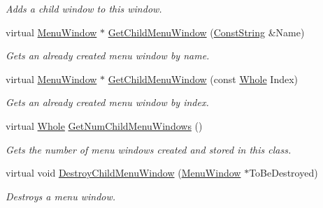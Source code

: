 \begin{DoxyCompactItemize}
\begin{DoxyCompactList}\small\item\em Adds a child window to this window. \item\end{DoxyCompactList}\item 
virtual \hyperlink{classphys_1_1UI_1_1MenuWindow}{MenuWindow} $\ast$ \hyperlink{classphys_1_1UI_1_1MenuWindow_ad1136c4e4b2ff9b9dc5d6aac2dba45a7}{GetChildMenuWindow} (\hyperlink{namespacephys_a5ce5049f8b4bf88d6413c47b504ebb31}{ConstString} \&Name)
\begin{DoxyCompactList}\small\item\em Gets an already created menu window by name. \item\end{DoxyCompactList}\item 
virtual \hyperlink{classphys_1_1UI_1_1MenuWindow}{MenuWindow} $\ast$ \hyperlink{classphys_1_1UI_1_1MenuWindow_a528d6397f8799219793978c70a26c22c}{GetChildMenuWindow} (const \hyperlink{namespacephys_a460f6bc24c8dd347b05e0366ae34f34a}{Whole} Index)
\begin{DoxyCompactList}\small\item\em Gets an already created menu window by index. \item\end{DoxyCompactList}\item 
virtual \hyperlink{namespacephys_a460f6bc24c8dd347b05e0366ae34f34a}{Whole} \hyperlink{classphys_1_1UI_1_1MenuWindow_ab3a6ae708ba2cea16cd0de176e265459}{GetNumChildMenuWindows} ()
\begin{DoxyCompactList}\small\item\em Gets the number of menu windows created and stored in this class. \item\end{DoxyCompactList}\item 
virtual void \hyperlink{classphys_1_1UI_1_1MenuWindow_ace2796c2d250fe1582f7c43333a7295e}{DestroyChildMenuWindow} (\hyperlink{classphys_1_1UI_1_1MenuWindow}{MenuWindow} $\ast$ToBeDestroyed)
\begin{DoxyCompactList}\small\item\em Destroys a menu window. \item\end{DoxyCompactList}\end{DoxyCompactItemize}
